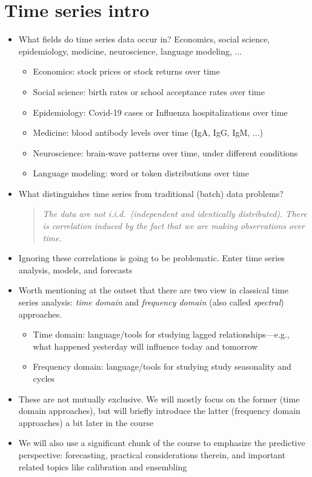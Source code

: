 \documentclass{article}
\begin{document}
\section{Time series intro}

\begin{itemize}
\item What fields do time series data occur in? Economics, social science, 
  epidemiology, medicine, neuroscience, language modeling, ...

\begin{itemize}
\item Economics: stock prices or stock returns over time
\item Social science: birth rates or school acceptance rates over time
\item Epidemiology: Covid-19 cases or Influenza hospitalizations over time 
\item Medicine: blood antibody levels over time (IgA, IgG, IgM, ...)
\item Neuroscience: brain-wave patterns over time, under different conditions
\item Language modeling: word or token distributions over time
\end{itemize}

\item What distinguishes time series from traditional (batch) data problems?

\begin{quote}
\emph{The data are not i.i.d.\ (independent and identically distributed). There
  is correlation induced by the fact that we are making observations over time.} 
\end{quote}

\item Ignoring these correlations is going to be problematic. Enter time series
  analysis, models, and forecasts

\item Worth mentioning at the outset that there are two view in classical time
  series analysis: \emph{time domain} and \emph{frequency domain} (also called
  \emph{spectral}) approaches. 

\begin{itemize}
\item Time domain: language/tools for studying lagged relationships---e.g., what 
  happened yesterday will influence today and tomorrow

\item Frequency domain: language/tools for studying study seasonality and 
  cycles
\end{itemize}

\item These are not mutually exclusive. We will mostly focus on the former (time 
  domain approaches), but will briefly introduce the latter (frequency domain
  approaches) a bit later in the course 

\item We will also use a significant chunk of the course to emphasize the
  predictive perspective: forecasting, practical considerations therein, and
  important related topics like calibration and ensembling
\end{itemize}
\end{document}
